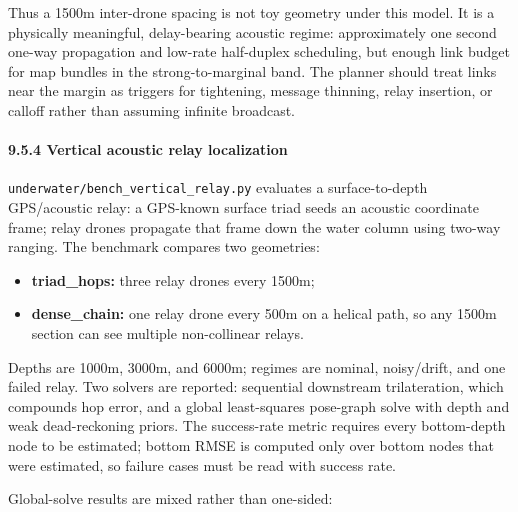 Thus a 1500m inter-drone spacing is not toy geometry under this model.
It is a physically meaningful, delay-bearing acoustic regime:
approximately one second one-way propagation and low-rate half-duplex
scheduling, but enough link budget for map bundles in the
strong-to-marginal band. The planner should treat links near the margin
as triggers for tightening, message thinning, relay insertion, or
calloff rather than assuming infinite broadcast.

\paragraph{9.5.4 Vertical acoustic relay
localization}\label{vertical-acoustic-relay-localization}

\texttt{underwater/bench\_vertical\_relay.py} evaluates a
surface-to-depth GPS/acoustic relay: a GPS-known surface triad seeds an
acoustic coordinate frame; relay drones propagate that frame down the
water column using two-way ranging. The benchmark compares two
geometries:

\begin{itemize}
\tightlist
\item
  \textbf{triad\_hops:} three relay drones every 1500m;
\item
  \textbf{dense\_chain:} one relay drone every 500m on a helical path,
  so any 1500m section can see multiple non-collinear relays.
\end{itemize}

Depths are 1000m, 3000m, and 6000m; regimes are nominal, noisy/drift,
and one failed relay. Two solvers are reported: sequential downstream
trilateration, which compounds hop error, and a global least-squares
pose-graph solve with depth and weak dead-reckoning priors. The
success-rate metric requires every bottom-depth node to be estimated;
bottom RMSE is computed only over bottom nodes that were estimated, so
failure cases must be read with success rate.

Global-solve results are mixed rather than one-sided:

